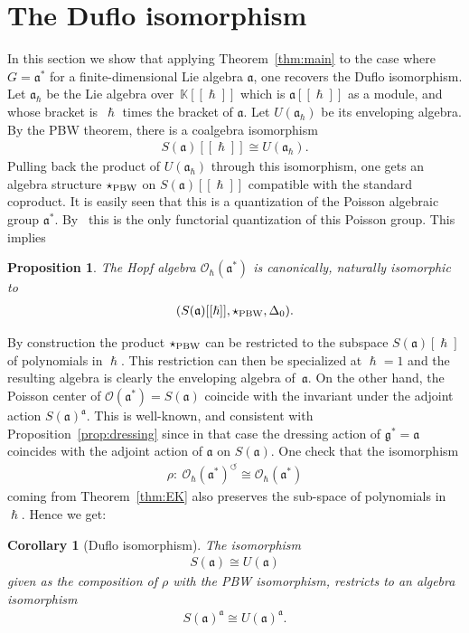 \documentclass[pdftex]{sigma}
\numberwithin{equation}{section}
\newcommand{\ca}{\circlearrowleft}
\newcommand{\mf}[1]{\mathfrak{#1}}
\newcommand{\h}{\hslash}
\newcommand{\cO}{\mathcal O}
\newcommand{\kk}{\mathbb K}
\newtheorem{cor}[thm]{Corollary}
\newtheorem{prop}[thm]{Proposition}
\theoremstyle{definition}
\begin{document}
\section{The Duf\/lo isomorphism}
In this section we show that applying Theorem~\ref{thm:main} to the case where $G=\mf a^*$ for a f\/inite-dimensional Lie algebra $\mf a$, one recovers the Duf\/lo isomorphism. Let $\mf a_\h$ be the Lie algebra over~$\kk[[\h]]$ which is $\mf a[[\h]]$ as a module, and whose bracket is~$\h$ times the bracket of $\mf a$. Let $U(\mf a_\h)$ be its enveloping algebra. By the PBW theorem, there is a coalgebra isomorphism
\begin{gather*}
	S(\mf a)[[\h]]\cong U(\mf a_\h).
\end{gather*}
Pulling back the product of $U(\mf a_\h)$ through this isomorphism, one gets an algebra structure $\star_{\rm PBW}$ on $S(\mf a)[[\h]]$ compatible with the standard coproduct. It is easily seen that this is a quantization of the Poisson algebraic group $\mf a^*$. By~\cite[Lemma~3.2]{Enriquez2010a} this is the only functorial quantization of this Poisson group. This implies
\begin{prop}
	The Hopf algebra $\cO_\h(\mf a^*)$ is canonically, naturally isomorphic to
\begin{gather*}
(S(\mf a)[[\h]],\star_{\rm PBW},\Delta_0).
\end{gather*}
\end{prop}

By construction the product $\star_{\rm PBW}$ can be restricted to the subspace $S(\mf a)[\h]$ of polynomials in $\h$. This restriction can then be specialized at $\h=1$ and the resulting algebra is clearly the enveloping algebra of~$\mf a$. On the other hand, the Poisson center of $\cO(\mf a^*)=S(\mf a)$ coincide with the invariant under the adjoint action $S(\mf a)^{\mf a}$. This is well-known, and consistent with Proposition~\ref{prop:dressing} since in that case the dressing action of $\mf g^*=\mf a$ coincides with the adjoint action of $\mf a$ on $S(\mf a)$. One check that the isomorphism
\begin{gather*}
	\rho\colon \ \cO_\h(\mf a^*)^\ca\cong \cO_\h(\mf a^*)
\end{gather*}
coming from Theorem~\ref{thm:EK} also preserves the sub-space of polynomials in $\h$. Hence we get:
\begin{cor}[Duf\/lo isomorphism]
The isomorphism
\begin{gather*}
	S(\mf a)\cong U(\mf a)
\end{gather*}
given as the composition of $\rho$ with the PBW isomorphism, restricts to an algebra isomorphism
\begin{gather*}
	S(\mf a)^{\mf a}\cong U(\mf a)^{\mf a}.
\end{gather*}
\end{cor}
\end{document}
